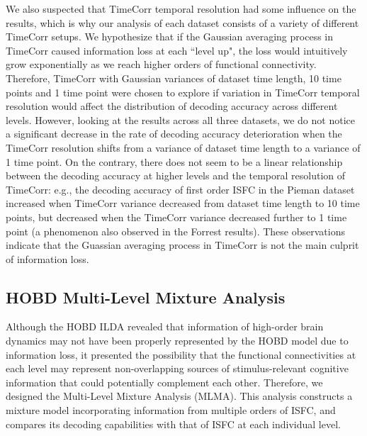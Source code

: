 \documentclass[11pt]{article}
\begin{document}
\begin{enumerate}
We also suspected that TimeCorr temporal resolution had some influence on the results, which is why our analysis of each dataset consists of a variety of different TimeCorr setups. We hypothesize that if the Gaussian averaging process in TimeCorr caused information loss at each ``level up", the loss would intuitively grow exponentially as we reach higher orders of functional connectivity. Therefore, TimeCorr with Gaussian variances of dataset time length, 10 time points and 1 time point were chosen to explore if variation in TimeCorr temporal resolution would affect the distribution of decoding accuracy across different levels. However, looking at the results across all three datasets, we do not notice a significant decrease in the rate of decoding accuracy deterioration when the TimeCorr resolution shifts from a variance of dataset time length to a variance of 1 time point. On the contrary, there does not seem to be a linear relationship between the decoding accuracy at higher levels and the temporal resolution of TimeCorr: e.g., the decoding accuracy of first order ISFC in the Pieman dataset increased when TimeCorr variance decreased from dataset time length to 10 time points, but decreased when the TimeCorr variance decreased further to 1 time point (a phenomenon also observed in the Forrest results). These observations indicate that the Guassian averaging process in TimeCorr is not the main culprit of information loss.

\subsection{HOBD Multi-Level Mixture Analysis}
Although the HOBD ILDA revealed that information of high-order brain dynamics may not have been properly represented by the HOBD model due to information loss, it presented the possibility that the functional connectivities at each level may represent non-overlapping sources of stimulus-relevant cognitive information that could potentially complement each other. Therefore, we designed the Multi-Level Mixture Analysis (MLMA). This analysis constructs a mixture model incorporating information from multiple orders of ISFC, and compares its decoding capabilities with that of ISFC at each individual level.


\end{enumerate}
\end{document}

